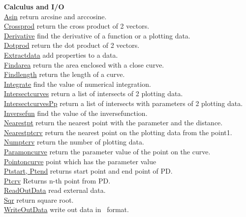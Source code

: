 \documentclass[papersize,a4paper,12pt]{article}
\begin{document}
\begin{tabbing}
{\bf Calculus and I/O} \> \\
\hyperlink{asin}{Asin} \> return arcsine and arccosine.\\
\hyperlink{crossprod}{Crossprod} \> return the cross product of 2 vectors.\\
\hyperlink{derivative}{Derivative} \> find the derivative of a function or a plotting data.\\
\hyperlink{dotprod}{Dotprod} \> return the dot product of 2 vectors.\\
\hyperlink{extractdata}{Extractdata} \> add properties to a data.\\
\hyperlink{findarea}{Findarea} \> return the area enclosed with a close curve.\\
\hyperlink{findlength}{Findlength} \> return the length of a curve.\\
\hyperlink{integrate}{Integrate} \> find the value of numerical integration.\\
\hyperlink{intersectcurves}{Intersectcurves} \> return a list of intersects of 2 plotting data.\\
\hyperlink{intersectcurvesPp}{IntersectcurvesPp} \> return a list of intersects with parameters of 2 plotting data.\\
\hyperlink{inversefun}{Inversefun} \> find the value of the inversefunction.\\
\hyperlink{nearestpt}{Nearestpt} \> return the nearest point with the parameter and the distance.\\
\hyperlink{nearestptcrv}{Nearestptcrv} \> return the nearest point on the plotting data from the point1.\\
\hyperlink{numptcrv}{Numptcrv} \> return the number of plotting data.\\
\hyperlink{paramoncurve}{Paramoncurve} \> return the parameter value of the point on the curve.\\
\hyperlink{pointoncurve}{Pointoncurve} \> point which has the parameter value\\
\hyperlink{ptstart, ptend}{Ptstart, Ptend} \> returns start point and end point of PD.\\
\hyperlink{ptcrv}{Ptcrv} \> Returns n-th point from PD.\\
\hyperlink{readoutdata}{ReadOutData} \> read external data.\\
\hyperlink{sqr}{Sqr} \> return square root.\\
\hyperlink{writeoutdata}{WriteOutData} \> write out data in \ketcindy\ format.\\


\end{tabbing}
\end{document}
